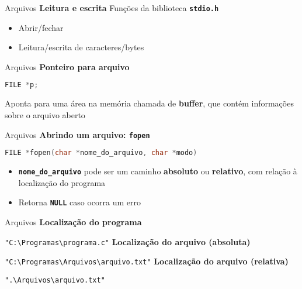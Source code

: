 \documentclass[10pt]{beamer}
\begin{document}
\begin{frame}{Arquivos}
  \huge
  \textbf{Leitura e escrita}
  \vfill
  \LARGE
  Funções da biblioteca \textbf{\texttt{stdio.h}}
  \vfill
  \begin{itemize}
    \item Abrir/fechar
    \item Leitura/escrita de caracteres/bytes
  \end{itemize}
\end{frame}

\begin{frame}[fragile]{Arquivos}
  \huge
  \textbf{Ponteiro para arquivo}
  \vfill
  \begin{lstlisting}[language=C]
FILE *p;
  \end{lstlisting}
  \vfill
  \large
  Aponta para uma área na memória chamada de \textbf{buffer}, que contém informações sobre o arquivo aberto
\end{frame}

\begin{frame}[fragile]{Arquivos}
  \huge
  \textbf{Abrindo um arquivo: \texttt{fopen}}
  \vfill
  \large
  \begin{lstlisting}[language=C]
FILE *fopen(char *nome_do_arquivo, char *modo)
  \end{lstlisting}
  \vfill
  \setlength{\leftmargini}{0pt}
  \begin{itemize}
      \item [] \textbf{\texttt{nome\_do\_arquivo}} pode ser um caminho \textbf{absoluto} ou \textbf{relativo}, com relação à localização do programa
      \item [] Retorna \textbf{\texttt{NULL}} caso ocorra um erro
  \end{itemize}
\end{frame}

\begin{frame}{Arquivos}
  \large
  \textbf{Localização do programa}

  \texttt{"C:\textbackslash Programas\textbackslash programa.c"}
  \vfill
  \textbf{Localização do arquivo (absoluta)}

  \texttt{"C:\textbackslash Programas\textbackslash Arquivos\textbackslash arquivo.txt"}
  \vfill
  \textbf{Localização do arquivo (relativa)}

  \texttt{".\textbackslash Arquivos\textbackslash arquivo.txt"}
\end{frame}
\end{document}
